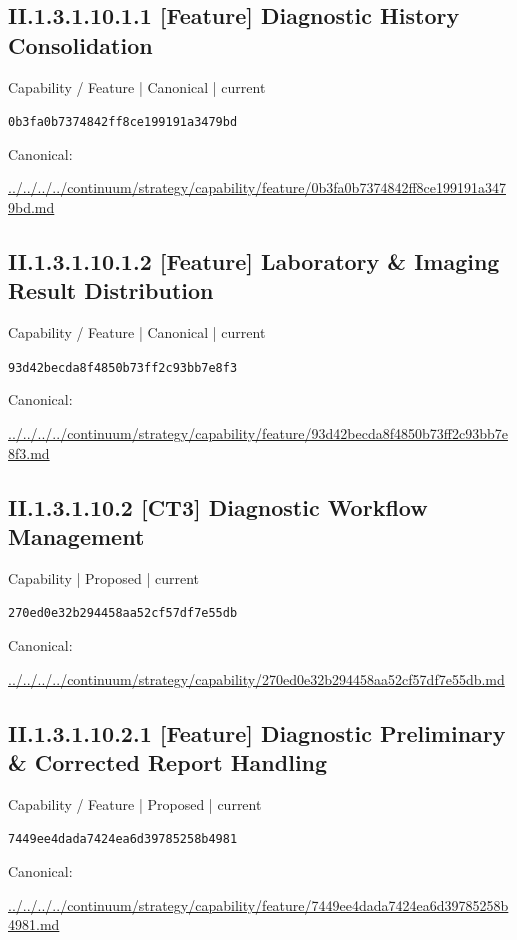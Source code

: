 \documentclass[10pt,a4paper]{article}
\begin{document}
\subsection*{II.1.3.1.10.1.1 [Feature] Diagnostic History Consolidation}
{\small Capability / Feature | Canonical | current}\par
\texttt{0b3fa0b7374842ff8ce199191a3479bd}\par
Canonical: \par
{\footnotesize\url{../../../../continuum/strategy/capability/feature/0b3fa0b7374842ff8ce199191a3479bd.md}}\par
\subsection*{II.1.3.1.10.1.2 [Feature] Laboratory \& Imaging Result Distribution}
{\small Capability / Feature | Canonical | current}\par
\texttt{93d42becda8f4850b73ff2c93bb7e8f3}\par
Canonical: \par
{\footnotesize\url{../../../../continuum/strategy/capability/feature/93d42becda8f4850b73ff2c93bb7e8f3.md}}\par
\subsection*{II.1.3.1.10.2 [CT3] Diagnostic Workflow Management}
{\small Capability | Proposed | current}\par
\texttt{270ed0e32b294458aa52cf57df7e55db}\par
Canonical: \par
{\footnotesize\url{../../../../continuum/strategy/capability/270ed0e32b294458aa52cf57df7e55db.md}}\par
\subsection*{II.1.3.1.10.2.1 [Feature] Diagnostic Preliminary \& Corrected Report Handling}
{\small Capability / Feature | Proposed | current}\par
\texttt{7449ee4dada7424ea6d39785258b4981}\par
Canonical: \par
{\footnotesize\url{../../../../continuum/strategy/capability/feature/7449ee4dada7424ea6d39785258b4981.md}}\par
\end{document}
